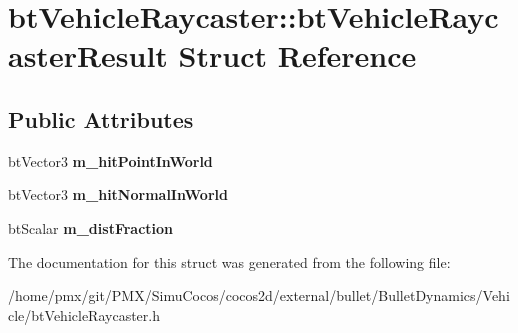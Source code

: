 \hypertarget{structbtVehicleRaycaster_1_1btVehicleRaycasterResult}{}\section{bt\+Vehicle\+Raycaster\+:\+:bt\+Vehicle\+Raycaster\+Result Struct Reference}
\label{structbtVehicleRaycaster_1_1btVehicleRaycasterResult}
\subsection*{Public Attributes}
\begin{DoxyCompactItemize}
\item 
\mbox{\label{structbtVehicleRaycaster_1_1btVehicleRaycasterResult_aa524cc6ed69db849b5b4f8887114bb9b}} 
bt\+Vector3 {\bfseries m\+\_\+hit\+Point\+In\+World}
\item 
\mbox{\label{structbtVehicleRaycaster_1_1btVehicleRaycasterResult_a7bae9a60b535b4a13a61faca33fe4381}} 
bt\+Vector3 {\bfseries m\+\_\+hit\+Normal\+In\+World}
\item 
\mbox{\label{structbtVehicleRaycaster_1_1btVehicleRaycasterResult_a3365bc5454d1c213342eb654d9e9f679}} 
bt\+Scalar {\bfseries m\+\_\+dist\+Fraction}
\end{DoxyCompactItemize}


The documentation for this struct was generated from the following file\+:\begin{DoxyCompactItemize}
\item 
/home/pmx/git/\+P\+M\+X/\+Simu\+Cocos/cocos2d/external/bullet/\+Bullet\+Dynamics/\+Vehicle/bt\+Vehicle\+Raycaster.\+h\end{DoxyCompactItemize}

